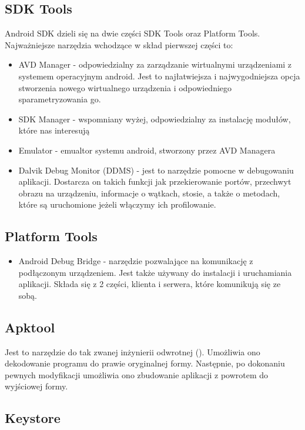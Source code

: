 \subsection{SDK Tools}

Android SDK dzieli się na dwie części SDK Tools oraz Platform Tools. Najważniejsze narzędzia wchodzące w skład pierwszej części to:
\begin{itemize}
\item AVD Manager - odpowiedzialny za zarządzanie wirtualnymi urządzeniami z systemem operacyjnym android. Jest to najłatwiejsza i najwygodniejsza opcja stworzenia nowego wirtualnego urządzenia i odpowiedniego sparametryzowania go.
\item SDK Manager - wspomniany wyżej, odpowiedzialny za instalację modułów, które nas interesują
\item Emulator - emualtor systemu android, stworzony przez AVD Managera
\item Dalvik Debug Monitor (DDMS) \label{ddms}- jest to narzędzie pomocne w debugowaniu aplikacji. Dostarcza on takich funkcji jak przekierowanie portów, przechwyt obrazu na urządzeniu, informacje o wątkach, stosie, a także o metodach, które są uruchomione jeżeli włączymy ich profilowanie.
\end{itemize}

\subsection{Platform Tools}

\begin{itemize}
\item Android Debug Bridge \label{adb}- narzędzie pozwalające na komunikację z podłączonym urządzeniem. Jest także używany do instalacji i uruchamiania aplikacji. Składa się z 2 części, klienta i serwera, które komunikują się ze sobą.
\end{itemize}

\subsection{Apktool}

Jest to narzędzie do tak zwanej inżynierii odwrotnej (). Umożliwia ono dekodowanie programu do prawie oryginalnej formy. Następnie, po dokonaniu pewnych modyfikacji umożliwia ono zbudowanie aplikacji z powrotem do wyjściowej formy.\cite{doc:apktool}

\subsection{Keystore}

